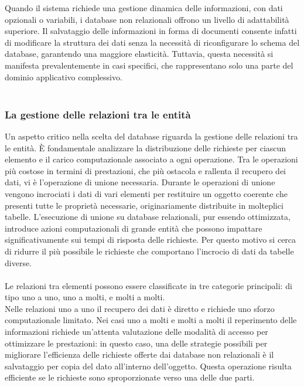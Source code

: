 Quando il sistema richiede una gestione dinamica delle informazioni, con dati opzionali o variabili, i database non relazionali offrono un livello di adattabilità superiore. 
Il salvataggio delle informazioni in forma di documenti consente infatti di modificare la struttura dei dati senza la necessità di riconfigurare lo schema del database, 
garantendo una maggiore elasticità. Tuttavia, questa necessità si manifesta prevalentemente in casi specifici, che rappresentano solo una parte del dominio applicativo complessivo. \\
\\

\subsubsection{La gestione delle relazioni tra le entità}
Un aspetto critico nella scelta del database riguarda la gestione delle relazioni tra le entità. 
È fondamentale analizzare la distribuzione delle richieste per ciascun elemento e il carico computazionale associato a ogni operazione. 
Tra le operazioni più costose in termini di prestazioni, che più ostacola e rallenta il recupero dei dati, vi è l’operazione di unione necessaria. 
Durante le operazioni di unione vengono incrociati i dati di vari elementi per restituire un oggetto coerente che presenti tutte le proprietà necessarie, 
originariamente distribuite in molteplici tabelle. 
L’esecuzione di unione su database relazionali, pur essendo ottimizzata, 
introduce azioni computazionali di grande entità che possono impattare significativamente sui tempi di risposta delle richieste. 
Per questo motivo si cerca di ridurre il più possibile le richieste che comportano l’incrocio di dati da tabelle diverse. \\
\\
Le relazioni tra elementi possono essere classificate in tre categorie principali: 
di tipo uno a uno, uno a molti, e molti a molti. \\
Nelle relazioni uno a uno il recupero dei dati è diretto e richiede uno sforzo computazionale limitato. 
Nei casi uno a molti e molti a molti il reperimento delle informazioni richiede un’attenta valutazione delle modalità di accesso per ottimizzare le prestazioni: 
in questo caso, una delle strategie possibili per migliorare l’efficienza delle richieste offerte dai database non relazionali è il salvataggio per copia del dato all’interno dell’oggetto. 
Questa operazione risulta efficiente se le richieste sono sproporzionate verso una delle due parti.\\
